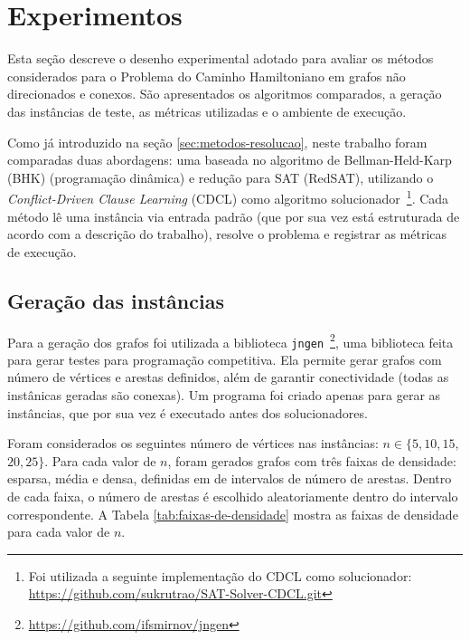 \section{Experimentos} \label{sec:experimentos}

Esta seção descreve o desenho experimental adotado para avaliar os métodos considerados para o Problema do Caminho Hamiltoniano em grafos não direcionados e conexos. São apresentados os algoritmos comparados, a geração das instâncias de teste, as métricas utilizadas e o ambiente de execução.

Como já introduzido na seção \ref{sec:metodos-resolucao}, neste trabalho foram comparadas duas abordagens: uma baseada no algoritmo de Bellman-Held-Karp (BHK) (programação dinâmica) e redução para SAT (RedSAT), utilizando o \textit{Conflict-Driven Clause Learning} (CDCL) como algoritmo solucionador~\footnote{Foi utilizada a seguinte implementação do CDCL como solucionador: \url{https://github.com/sukrutrao/SAT-Solver-CDCL.git}}. Cada método lê uma instância via entrada padrão (que por sua vez está estruturada de acordo com a descrição do trabalho), resolve o problema e registrar as métricas de execução.

\subsection{Geração das instâncias}
Para a geração dos grafos foi utilizada a biblioteca \texttt{jngen}~\footnote{\url{https://github.com/ifsmirnov/jngen}}, uma biblioteca feita para gerar testes para programação competitiva. Ela permite gerar grafos com número de vértices e arestas definidos, além de garantir conectividade (todas as instânicas geradas são conexas). Um programa foi criado apenas para gerar as instâncias, que por sua vez é executado antes dos solucionadores.

Foram considerados os seguintes número de vértices nas instâncias: $n \in \{5,10,15,$ $20,25\}$. Para cada valor de $n$, foram gerados grafos com três faixas de densidade: esparsa, média e densa, definidas em de intervalos de número de arestas. Dentro de cada faixa, o número de arestas é escolhido aleatoriamente dentro do intervalo correspondente. A Tabela \ref{tab:faixas-de-densidade} mostra as faixas de densidade para cada valor de $n$.

